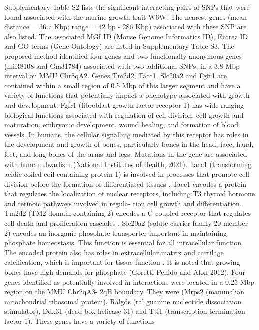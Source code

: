 \documentclass[preprint,12pt,3p]{elsarticle}
\begin{document}
Supplementary Table S2  lists the significant interacting pairs of SNPs that were found associated with the
murine growth trait W6W. The nearest genes (mean distance = 36.7 Kbp; range = 42 bp - 286 Kbp) associated with these SNP
are also listed. The associated MGI ID (Mouse Genome Informatics ID), Entrez ID and GO terms (Gene Ontology) are listed
in Supplementary Table S3. 
The proposed method identified four genes and two functionally
anonymous genes (miR8108 and Gm31784) associated with two additional SNPs, in a 3.8 Mbp interval on MMU Chr8qA2.  Genes
Tm2d2, Tacc1, Slc20a2 and Fgfr1 are contained within a small region of 0.5 Mbp of this larger segment and have a variety
of functions that potentially impact a phenotype associated with growth and development. Fgfr1 (fibroblast growth factor
receptor 1) has wide ranging biological functions associated with regulation of cell division, cell growth and
maturation, embryonic development, wound healing, and formation of blood vessels. In humans, the cellular signalling
mediated by this receptor has roles in the development and growth of bones, particularly bones in the head, face, hand,
feet, and long bones of the arms and legs. Mutations in the gene are associated with human dwarfism (National Institutes
of Health, 2021). Tacc1 (transforming acidic coiled-coil containing protein 1) is involved in processes that promote
cell division before the formation of differentiated tissues \cite[]{stelzerGeneCardsSuiteGene2016}. Tacc1 encodes a protein that
regulates the localization of nuclear receptors, including T3 thyroid hormone and retinoic pathways involved in regula-
tion cell growth and differentiation. Tm2d2 (TM2 domain containing 2) encodes a G-coupled receptor that regulates cell
death and proliferation cascades \cite[]{stelzerGeneCardsSuiteGene2016}. Slc20a2 (solute carrier family 20 member 2) encodes an
inorganic phosphate transporter important in maintaining phosphate homeostasis.  This function is essential for all
intracellular function. The encoded protein also has roles in extracellular matrix and cartilage calcification, which
is important for tissue function \cite[]{stelzerGeneCardsSuiteGene2016}. It is noted that growing bones have high demands for phosphate
(Goretti Penido and Alon 2012).  Four genes identified as potentially involved in interactions were located in a 0.25
Mbp region on the MMU Chr2qA3- 2qB boundary. They were (Mrps2 (mammalian mitochondrial ribosomal protein), Ralgds (ral
guanine nucleotide dissociation stimulator), Ddx31 (dead-box helicase 31) and Ttf1 (transcription termination factor
1). These genes have a variety of functions
\end{document}
